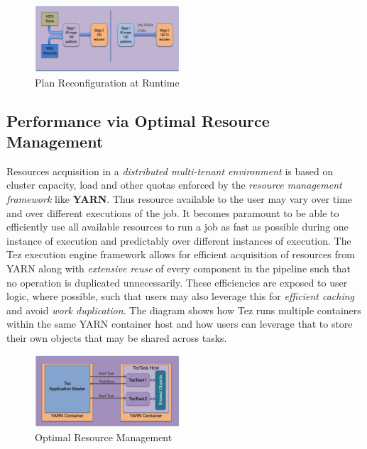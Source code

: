 \documentclass[twocolumn]{article}
\begin{document}
\begin{figure}[htb]
        \centering
        \includegraphics[width=0.48\textwidth]{tez3}
        \caption{Plan Reconfiguration at Runtime}
        \label{fig05}
\end{figure}

\subsection{Performance via Optimal Resource Management}

Resources acquisition in a \emph{distributed multi-tenant environment}
is based on cluster capacity, load and other quotas enforced by the
\emph{resource management framework} like \textbf{YARN}. Thus resource
available to the user may vary over time and over different executions
of the job. It becomes paramount to be able to efficiently use all
available resources to run a job as fast as possible during one instance
of execution and predictably over different instances of execution. The
Tez execution engine framework allows for efficient acquisition of
resources from YARN along with \emph{extensive reuse} of every component
in the pipeline such that no operation is duplicated unnecessarily.
These efficiencies are exposed to user logic, where possible, such that
users may also leverage this for \emph{efficient caching} and avoid
\emph{work duplication}. The diagram shows how Tez runs multiple
containers within the same YARN container host and how users can
leverage that to store their own objects that may be shared across
tasks.

\begin{figure}[htb]
        \centering
        \includegraphics[width=0.48\textwidth]{tez4}
        \caption{Optimal Resource Management}
        \label{fig06}
\end{figure}
\end{document}
